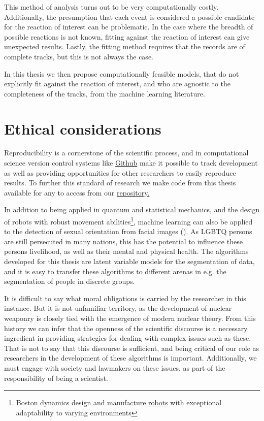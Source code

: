 This method of analysis turns out to be very computationally costly. Additionally, the presumption that each event is considered a possible candidate for the reaction of interest can be problematic. In the case where the breadth of possible reactions is not known, fitting against the reaction of interest can give unexpected results. Lastly, the fitting method requires that the records are of complete tracks, but this is not always the case.

In this thesis we then propose computationally feasible models, that do not explicitly fit against the reaction of interest, and who are agnostic to the completeness of the tracks, from the machine learning literature.

\section{Ethical considerations}

Reproducibility is a cornerstone of the scientific process, and in computational science version control systems like \href{https://github.com/}{Github} make it possible to track development as well as providing opportunities for other researchers to easily reproduce results. To further this standard of research we make code from this thesis available for any to access from our \href{https://github.com/ATTPC/VAE-event-classification}{repository.} 

In addition to being applied in quantum and statistical mechanics, and the design of robots with robust movement abilities\footnote{Boston dynamics design and manufacture \href{https://www.youtube.com/watch?v=LikxFZZO2sk}{robots} with exceptional adaptability to varying environments}, machine learning can also be applied to the detection of sexual orientation from facial images (\citet{Wang2018}). As LGBTQ persons are still persecuted in many nations, this has the potential to influence these persons livelihood, as well as their mental and physical health. The algorithms developed for this thesis are latent variable models for the segmentation of data, and it is easy to transfer these algorithms to different arenas in e.g. the segmentation of people in discrete groups.

It is difficult to say what moral obligations is carried by the researcher in this instance. But it is not unfamiliar territory, as the development of nuclear weaponry is closely tied with the emergence of modern nuclear theory. From this history we can infer that the openness of the scientific discourse is a necessary ingredient in providing strategies for dealing with complex issues such as these. That is not to say that this discourse is sufficient, and being critical of our role as researchers in the development of these algorithms is important. Additionally, we must engage with society and lawmakers on these issues, as part of the responsibility of being a scientist. 

